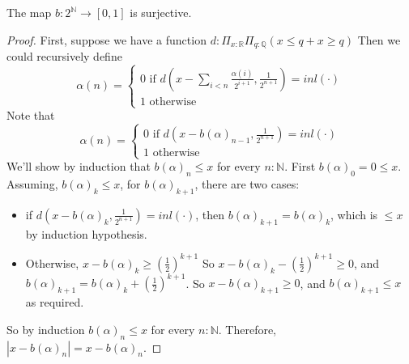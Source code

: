 \begin{lemma}
  The map $b: 2^\mathbb N \to [0,1]$ is surjective. 
\end{lemma}
\begin{proof}
  First, suppose we have a function 
  $d:\Pi_{x:\mathbb R} \Pi_{q: \mathbb Q} (x \leq q + x \geq q)$
  Then we could recursively define 
  $$\alpha(n) = \begin{cases}
    0 \text{ if } d(x - \sum\limits_{i<n} \frac{\alpha(i)}{2^{i+1}} , \frac{1}{2^{n+1}}) = inl(\cdot) \\
    1 \text{ otherwise}
  \end{cases}
  $$
  Note that 
  $$\alpha(n) = \begin{cases}
    0 \text{ if } d(x - b(\alpha)_{n-1} , \frac{1}{2^{n+1}}) = inl(\cdot) \\
    1 \text{ otherwise}
  \end{cases}
  $$
  We'll show by induction that $b(\alpha)_n \leq x$ for every $n:\mathbb N$. 
  First $b(\alpha)_0 = 0 \leq x$. 
  Assuming, $b(\alpha)_k \leq x$, for $b(\alpha)_{k+1}$, 
  there are two cases:
  \begin{itemize}
    \item 
     if $d(x -  b(\alpha)_k, \frac{1}{2^{n+1}}) = inl(\cdot)$, 
     then $b(\alpha)_{k+1} = b(\alpha)_k$, which is $\leq x$ by induction hypothesis. 
   \item 
     Otherwise, $ x - b(\alpha)_k \geq (\frac12)^{k+1}$
     So $x-b(\alpha)_k - (\frac12)^{k+1} \geq 0$, 
     and $b(\alpha)_{k+1} = b(\alpha)_k + (\frac12)^{k+1}$. 
     So $x-b(\alpha)_{k+1} \geq 0$, and $b(\alpha)_{k+1} \leq x$ as required. 
 \end{itemize}
 So by induction $b(\alpha)_n\leq x$ for every $n:\mathbb N$. 
 Therefore, $|x-b(\alpha)_n| = x-b(\alpha)_n$. 
  

\end{proof}
